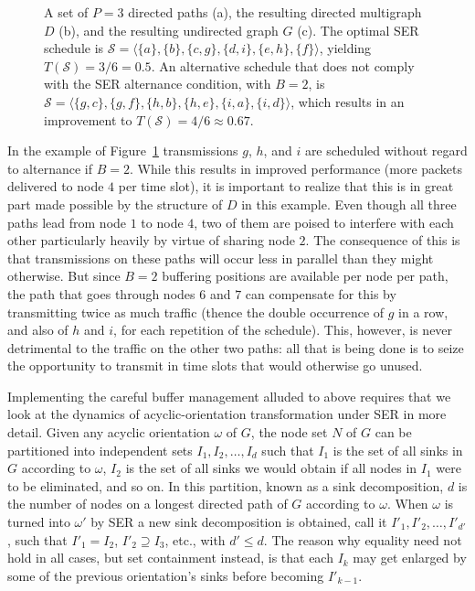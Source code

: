 \documentclass{article}
\begin{document}
\begin{figure}[t]
\centering
{}
\caption{A set of $P=3$ directed paths (a), the resulting directed multigraph
$D$ (b), and the resulting undirected graph $G$ (c). The optimal SER schedule is
$\mathcal{S}=\langle\{a\},\allowbreak
\{b\},\allowbreak
\{c,g\},\allowbreak
\{d,i\},\allowbreak
\{e,h\},\allowbreak
\{f\}\rangle$,
yielding $T(\mathcal{S})=3/6=0.5$. An alternative schedule that does not comply
with the SER alternance condition, with $B=2$, is
$\mathcal{S}=\langle\{g,c\},\allowbreak
\{g,f\},\allowbreak
\{h,b\},\allowbreak
\{h,e\},\allowbreak
\{i,a\},\allowbreak
\{i,d\}\rangle$,
which results in an improvement to $T(\mathcal{S})=4/6\approx 0.67$.}
\label{fig5}
\end{figure}

In the example of Figure~\ref{fig5} transmissions $g$, $h$, and $i$ are
scheduled without regard to alternance if $B=2$. While this results in improved
performance (more packets delivered to node $4$ per time slot), it is important
to realize that this is in great part made possible by the structure of $D$ in
this example. Even though all three paths lead from node $1$ to node $4$, two of
them are poised to interfere with each other particularly heavily by virtue of
sharing node $2$. The consequence of this is that transmissions on these paths
will occur less in parallel than they might otherwise. But since $B=2$ buffering
positions are available per node per path, the path that goes through nodes $6$
and $7$ can compensate for this by transmitting twice as much traffic (thence
the double occurrence of $g$ in a row, and also of $h$ and $i$, for each
repetition of the schedule). This, however, is never detrimental to the traffic
on the other two paths: all that is being done is to seize the opportunity to
transmit in time slots that would otherwise go unused.

Implementing the careful buffer management alluded to above requires that we
look at the dynamics of acyclic-orientation transformation under SER in more
detail. Given any acyclic orientation $\omega$ of $G$, the node set $N$ of $G$
can be partitioned into independent sets $I_1,I_2,\ldots,I_d$ such that $I_1$ is
the set of all sinks in $G$ according to $\omega$, $I_2$ is the set of all sinks
we would obtain if all nodes in $I_1$ were to be eliminated, and so on. In this
partition, known as a sink decomposition, $d$ is the number of nodes on a
longest directed path of $G$ according to $\omega$. When $\omega$ is turned into
$\omega'$ by SER a new sink decomposition is obtained, call it
$I'_1,I'_2,\ldots,I'_{d'}$, such that $I'_1=I_2$, $I'_2\supseteq I_3$, etc.,
with $d'\le d$. The reason why equality need not hold in all cases, but set
containment instead, is that each $I_k$ may get enlarged by some of the previous
orientation's sinks before becoming $I'_{k-1}$.
\end{document}
